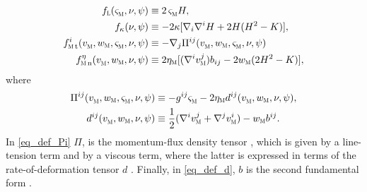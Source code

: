 \begin{align}
    \label{eq_def_f_lap}
    f_\lapl (\sigmam{}, \nu,\psi)               & \equiv  2\, \sigmam{} H ,                                   \\
    \label{eq_def_f_kap}
    f_\kap (\nu,\psi)                           & \equiv  -2\kap [ \nab_i \nab^i H + 2 H (H^2-K)],            \\
    \label{eq_def_fmemt}
    \fmemt^i(\vmem{}, \wmem,\sigmam{},\nu,\psi) & \equiv - \nab_j \Pi^{ij}(\vmem{}, \wmem,\sigmam{},\nu,\psi) \\
    \label{eq_def_f_eta_n}
    \fetamemn      (\vmem{}, \wmem, \nu, \psi)  & \equiv
    2 \etam [ (\nab^i \vmem{j})b_{ij} - 2 \wmem (2 H^2 - K)                                                                 ]  ,
\end{align}
where
\begin{align}
    \label{eq_def_Pi}
    \Pi^{ij}(\vmem{}, \wmem,\sigmam{},\nu,\psi) & \equiv    -   g^{ij}\sigmam{} - 2 \etam d^{ij}(\vmem{}, \wmem,\nu,\psi) , \\
    \label{eq_def_d}
    d^{ij}(\vmem{}, \wmem,\nu,\psi)             & \equiv  \frac{1}{2}( \nab^i \vmem{j}  + \nab^j \vmem{i}) - \wmem b^{ij}.
\end{align}
In \cref{eq_def_Pi} $\Pi$, is the momentum-flux density tensor \cite{landauFluidMechanics1987}, which is given by a line-tension term and by a viscous term, where the latter is expressed in terms of the rate-of-deformation tensor $d$ \cite{al-izziShearDrivenInstabilitiesMembrane2020}. Finally, in \cref{eq_def_d}, $b$ is  the second fundamental form \cite{marchiafavaAppuntiDiGeometria2005,desernoNotesDifferentialGeometry2004}.
% 

